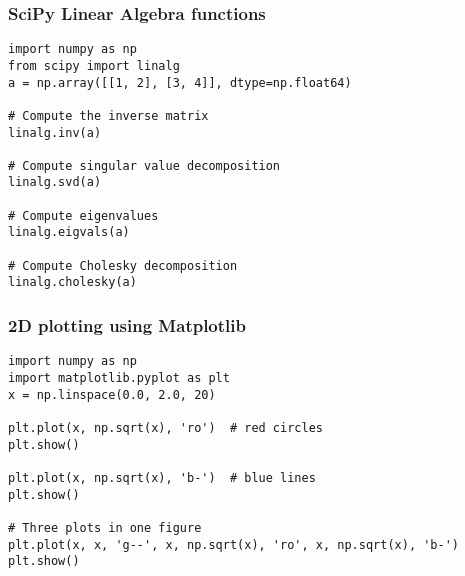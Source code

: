 \documentclass[10pt]{beamer}
\begin{document}
\begin{frame}[fragile]
\frametitle{SciPy Linear Algebra functions}
\begin{verbatim}
import numpy as np
from scipy import linalg
a = np.array([[1, 2], [3, 4]], dtype=np.float64)

# Compute the inverse matrix
linalg.inv(a)

# Compute singular value decomposition
linalg.svd(a)

# Compute eigenvalues
linalg.eigvals(a)

# Compute Cholesky decomposition
linalg.cholesky(a)
\end{verbatim}
\end{frame}

\begin{frame}[fragile]
\frametitle{2D plotting using Matplotlib}
\begin{verbatim}
import numpy as np
import matplotlib.pyplot as plt
x = np.linspace(0.0, 2.0, 20)

plt.plot(x, np.sqrt(x), 'ro')  # red circles
plt.show()

plt.plot(x, np.sqrt(x), 'b-')  # blue lines
plt.show()

# Three plots in one figure
plt.plot(x, x, 'g--', x, np.sqrt(x), 'ro', x, np.sqrt(x), 'b-')
plt.show()
\end{verbatim}
\end{frame}
\end{document}

